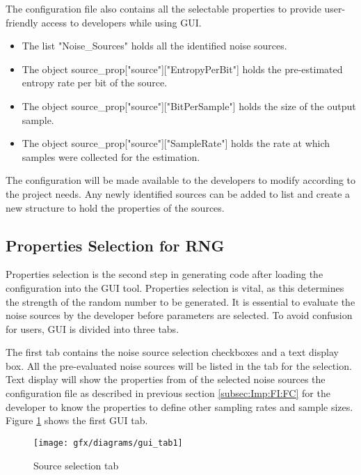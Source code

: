 The configuration file also contains all the selectable properties to provide user-friendly access to developers while using GUI.
\begin{itemize}
	\item The list "Noise\_Sources" holds all the identified noise sources.
	
	\item The object source\_prop["source"]["EntropyPerBit"] holds the pre-estimated entropy rate per bit of the source.
	
	\item The object source\_prop["source"]["BitPerSample"] holds the size of the output sample.
	
	\item The object source\_prop["source"]["SampleRate"] holds the rate at which samples were collected for the estimation.
\end{itemize}
 The configuration will be made available to the developers to modify according to the project needs. Any newly identified sources can be added to list and create a new structure to hold the properties of the sources. 

%
%
\subsection{Properties Selection for RNG}
\label{subsec:Imp:FI:NSS}
Properties selection is the second step in generating code after loading the configuration into the GUI tool. Properties selection is vital, as this determines the strength of the random number to be generated. It is essential to evaluate the noise sources by the developer before parameters are selected. To avoid confusion for users, GUI is divided into three tabs.

The first tab contains the noise source selection checkboxes and a text display box. All the pre-evaluated noise sources will be listed in the tab for the selection. Text display will show the properties from of the selected noise sources the configuration file as described in previous section \ref{subsec:Imp:FI:FC} for the developer to know the properties to define other sampling rates and sample sizes. Figure \ref{fig:5:3} shows the first GUI tab.

\begin{figure}[!h]
	\centering
	\texttt{[image: gfx/diagrams/gui\_tab1]}
	\caption{Source selection tab}
	\label{fig:5:3}
\end{figure}

